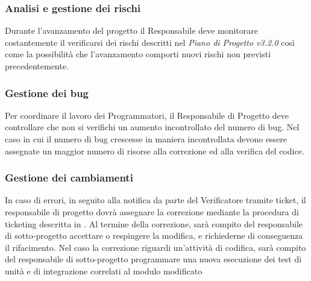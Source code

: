 \subsubsection{Analisi e gestione dei rischi}
\label{}
Durante l'avanzamento del progetto il Responsabile  deve monitorare costantemente il verificarsi dei rischi descritti nel \emph{Piano di Progetto v3.2.0} così come la possibilità che l'avanzamento comporti nuovi rischi non previsti precedentemente.

\subsubsection{Gestione dei bug}
Per coordinare il lavoro dei Programmatori, il Responsabile di Progetto deve controllare che non
si verifichi un aumento incontrollato del numero di bug. Nel caso in cui il numero di bug crescesse in maniera incontrollata
devono essere assegnate un maggior numero di risorse alla correzione ed alla verifica del codice.

\subsubsection{Gestione dei cambiamenti}

In caso di errori, in seguito alla notifica da parte del Verificatore tramite ticket, il
responsabile di progetto dovrà assegnare la correzione mediante la procedura di
ticketing descritta in 
. Al termine della correzione, sarà compito del responsabile
di sotto-progetto accettare o respingere la modifica, e richiederne di conseguenza il rifacimento.
Nel caso la correzione riguardi un’attività di codifica, sarà compito del responsabile di sotto-progetto programmare una nuova esecuzione dei test di unità e di integrazione correlati al modulo modificato


